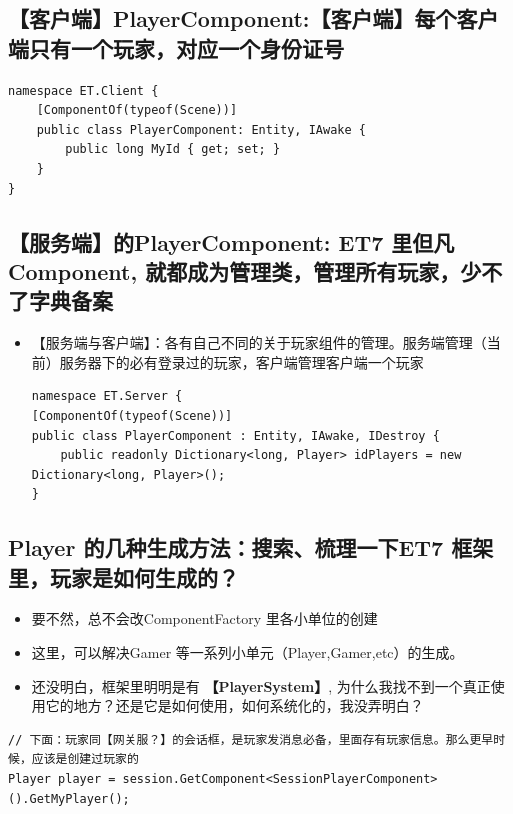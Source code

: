 \documentclass[9pt, b5paper]{article}
\begin{document}
\subsection{【客户端】PlayerComponent:【客户端】每个客户端只有一个玩家，对应一个身份证号}
\label{sec-9-3}
\begin{verbatim}
namespace ET.Client {
    [ComponentOf(typeof(Scene))]
    public class PlayerComponent: Entity, IAwake {
        public long MyId { get; set; }
    }
}
\end{verbatim}
\subsection{【服务端】的PlayerComponent: ET7 里但凡Component, 就都成为管理类，管理所有玩家，少不了字典备案}
\label{sec-9-4}
\begin{itemize}
\item 【服务端与客户端】：各有自己不同的关于玩家组件的管理。服务端管理（当前）服务器下的必有登录过的玩家，客户端管理客户端一个玩家
\begin{verbatim}
namespace ET.Server {
[ComponentOf(typeof(Scene))]
public class PlayerComponent : Entity, IAwake, IDestroy {
    public readonly Dictionary<long, Player> idPlayers = new Dictionary<long, Player>();
}
\end{verbatim}
\end{itemize}
\subsection{Player 的几种生成方法：搜索、梳理一下ET7 框架里，玩家是如何生成的？}
\label{sec-9-5}
\begin{itemize}
\item 要不然，总不会改ComponentFactory 里各小单位的创建
\item 这里，可以解决Gamer 等一系列小单元（Player,Gamer,etc）的生成。
\item 还没明白，框架里明明是有 \textbf{【PlayerSystem】}, 为什么我找不到一个真正使用它的地方？还是它是如何使用，如何系统化的，我没弄明白？
\end{itemize}
\begin{verbatim}
// 下面：玩家同【网关服？】的会话框，是玩家发消息必备，里面存有玩家信息。那么更早时候，应该是创建过玩家的
Player player = session.GetComponent<SessionPlayerComponent>().GetMyPlayer();
\end{verbatim}
\end{document}
